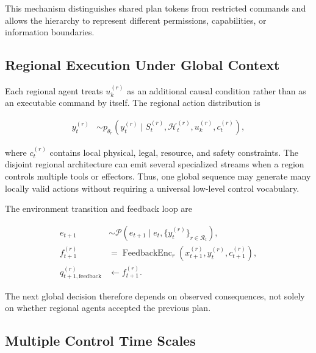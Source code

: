 This mechanism distinguishes shared plan tokens from restricted commands and allows the hierarchy to represent different permissions, capabilities, or information boundaries.

\subsection{\textbf{Regional Execution Under Global Context}}

Each regional agent treats $u_k^{(r)}$ as an additional causal condition rather than as an executable command by itself. The regional action distribution is

\begin{equation}
\begin{aligned}
    y_t^{(r)}
    &\sim p_{\theta_r}\!\left(
       y_t^{(r)}
       \mid S_t^{(r)},
       \mathcal{H}_t^{(r)},
       u_k^{(r)},
       c_t^{(r)}
       \right),
\end{aligned}
\label{eq:regional_execution}
\end{equation}

where $c_t^{(r)}$ contains local physical, legal, resource, and safety constraints. The disjoint regional architecture can emit several specialized streams when a region controls multiple tools or effectors. Thus, one global sequence may generate many locally valid actions without requiring a universal low-level control vocabulary.

The environment transition and feedback loop are

\begin{equation}
\begin{aligned}
    e_{t+1}
    &\sim \mathcal{P}\!\left(
       e_{t+1}\mid e_t,
       \{y_t^{(r)}\}_{r\in\mathcal{R}_t}
       \right),\\
    f_{t+1}^{(r)}
    &= \operatorname{FeedbackEnc}_{r}\!\left(
       x_{t+1}^{(r)},y_t^{(r)},c_{t+1}^{(r)}
       \right),\\
    q_{t+1,\mathrm{feedback}}^{(r)}
    &\leftarrow f_{t+1}^{(r)}.
\end{aligned}
\label{eq:hierarchical_feedback}
\end{equation}

The next global decision therefore depends on observed consequences, not solely on whether regional agents accepted the previous plan.

\subsection{\textbf{Multiple Control Time Scales}}

